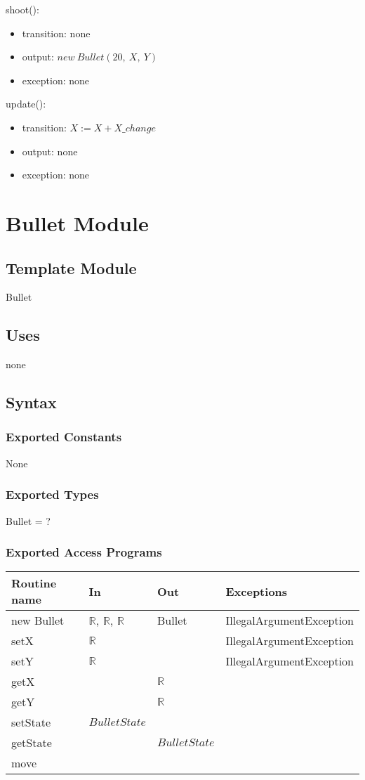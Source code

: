 \documentclass[12pt]{article}
\begin{document}
\noindent shoot():
\begin{itemize}
\item transition: none
\item output: $new\ Bullet(20,\ X,\ Y)$
\item exception: none
\end{itemize}

\noindent update():
\begin{itemize}
\item transition: $X := X + X\_change$
\item output: none
\item exception: none
\end{itemize}
\newpage

\section{Bullet Module}

\subsection*{Template Module}
Bullet

\subsection*{Uses}
none

\subsection*{Syntax}
\subsubsection*{Exported Constants}
None
\subsubsection*{Exported Types}
Bullet = ?
\subsubsection*{Exported Access Programs}
\begin{tabular}{| l | l | l | p{5cm} |}
\hline
\textbf{Routine name} & \textbf{In} & \textbf{Out} & \textbf{Exceptions}\\
\hline
new Bullet & $\mathbb{R}$, $\mathbb{R}$, $\mathbb{R}$ & Bullet & IllegalArgumentException\\
\hline
setX & $\mathbb{R}$ &  & IllegalArgumentException\\
\hline
setY & $\mathbb{R}$ &  & IllegalArgumentException\\
\hline
getX &    & $\mathbb{R}$ & \\
\hline
getY &    & $\mathbb{R}$ & \\
\hline
setState & $BulletState$ & &\\
\hline
getState & & $BulletState$ &\\
\hline
move & & &\\
\hline
\end{tabular}
\end{document}
